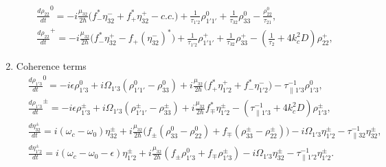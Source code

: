 \documentclass[twocolumn,secnumarabic,amssymb, nobibnotes, aps, prd]{revtex4-1}
\begin{document}
\begin{enumerate}
{\begin{subequations}
\begin{align}
			&\frac{d \rho_{22}}{d t}^{0}  = -i\frac{\mu_{32}}{2\hbar} \big (f_{-}^*\eta_{32}^{-}+f_{+}^*\eta_{32}^{+} - c.c. \big ) + \frac{1}{\tau_{1'2}}\rho_{1'1'}^0  +  \frac{1}{\tau_{32}}\rho_{33}^{0} - \frac{\rho_{22}^0}{\tau_{21}} , \\
			&\frac{d \rho_{22}}{d t}^{+}   = - i\frac{\mu_{32}}{2\hbar}\big ( f_{-}^*\eta_{32}^{+}-f_{+}(\eta_{32}^{-})^* \big )  + \frac{1}{\tau_{1'2}}\rho_{1'1'}^+  +  \frac{1}{\tau_{32}}\rho_{33}^+ - (\frac{1}{\tau_{2}}+4k_c^2D) \rho_{22}^+ , \label{eq:rtpop2grating}
			\end{align}
		\end{subequations}}
		\item {Coherence terms
			\begin{subequations}
				\label{eq:coherencesdm}
				\begin{align}
				&\frac{d \rho_{1'3}}{d t}^0  = -i\epsilon\rho_{1'3}^0 +i \Omega_{1'3}(\rho_{1'1'}^{0} - \rho_{33}^{0}) +i\frac{\mu_{32}}{2 \hbar}\big (f_{+}^*\eta_{1'2}^{+}+f_{-}^*\eta_{1'2}^{-} \big ) -
				\tau_{\parallel 1'3}^{-1} \rho_{1'3}^{0} ,  \\
				&\frac{d \rho_{1'3}}{d t} ^\pm = -i\epsilon\rho_{1'3}^\pm  +i\Omega_{1'3}(\rho_{1'1'}^{\pm} - \rho_{33}^{\pm}) +i \frac{\mu_{32}}{2 \hbar} f_{\mp}^* \eta_{1'2}^{\pm} 
				- (\tau_{\parallel 1'3}^{-1} +4k_c^2 D)\rho_{1'3}^{\pm} ,\label{eq:rho13grating}\\
				&\frac{d \eta_{32}^{\pm}}{d t}   = i(\omega_c - \omega_{0})\eta_{32}^{\pm} +i \frac{\mu_{32}}{2\hbar}\Big(  f_{\pm}(\rho_{33}^0-\rho_{22}^0) + f_{\mp}(\rho_{33}^\pm-\rho_{22}^\pm) \Big ) - i\Omega_{1'3}\eta_{1'2}^{\pm}
				- \tau_{\parallel 32}^{-1}\eta_{32}^\pm , \\
				&\frac{d \eta_{1'2}^\pm}{d t}  = i(\omega_c - \omega_{0}-\epsilon)\eta_{1'2}^{\pm} +i \frac{\mu_{32}}{2\hbar}(f_{\pm }\rho_{1'3}^0 + f_{\mp} \rho_{1'3}^{\pm}) - i\Omega_{1'3}\eta_{32}^{\pm} - \tau_{\parallel 1'2}^{-1}\eta_{1'2}^\pm.\label{eq:rho12-dm}
				\end{align}
			\end{subequations}}
		\end{enumerate}
\end{document}
